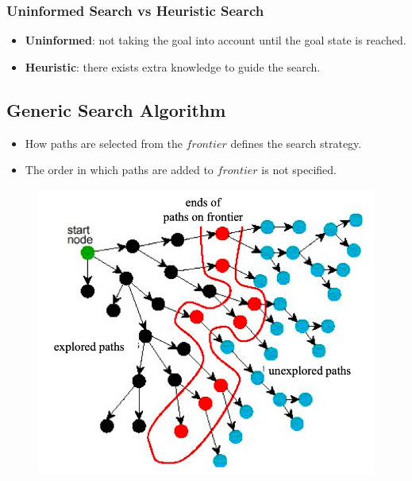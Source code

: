\documentclass{article}
\begin{document}
\subsubsection{Uninformed Search vs Heuristic Search}

\begin{itemize}
    \item \textbf{Uninformed}: not taking the goal into account until the goal state is reached.
    \item \textbf{Heuristic}: there exists extra knowledge to guide the search.
\end{itemize}

\subsection{Generic Search Algorithm}

\begin{algorithmic}
        \EndIf
        \EndFor
    \EndWhile
\end{algorithmic}

\begin{itemize}
    \item How paths are selected from the $frontier$ defines the search strategy.
    \item The order in which paths are added to $frontier$ is not specified.
\end{itemize}

\begin{figure}[H]
    \includegraphics[width=\textwidth]{generic_search_algo_visualization}
    \centering
\end{figure}
\end{document}
